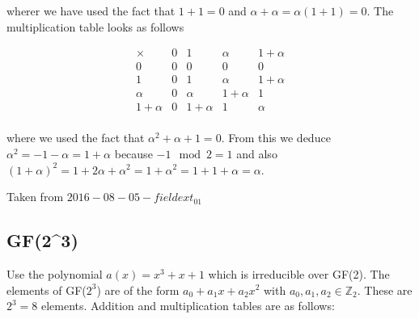 wherer we have used the fact that \(1 + 1 = 0\) and
\(\alpha + \alpha = \alpha (1+1) = 0\). The multiplication table looks
as follows

\[
\begin{array}{c|cccc}
\times  &    0        & 1        & \alpha     & 1+\alpha \\
\hline
0 &        0        & 0        & 0          & 0 \\
1 &        0        & 1        & \alpha     & 1 + \alpha   \\
\alpha &   0        & \alpha   & 1 + \alpha & 1        \\ 
1+\alpha & 0        &1+\alpha &  1  &        \alpha      \\
\end{array}
\]

where we used the fact that \(\alpha^2 + \alpha +1 =0\). From this we
deduce \(\alpha^2=-1-\alpha = 1 + \alpha\) because \(-1 \mod 2 =1\) and
also
\((1+\alpha)^2 = 1 + 2\alpha + \alpha^2 = 1 + \alpha^2 = 1 + 1 + \alpha = \alpha\).

Taken from $2016-08-05-fieldext_01$

\subsection{GF(2\^{}3)}\label{gf23}

Use the polynomial \(a(x)=x^3+x+1\) which is irreducible over GF(2). The
elements of GF(\(2^3\)) are of the form \(a_0 + a_1 x + a_2 x^2\) with
\(a_0, a_1, a_2 \in \mathbb{Z}_2\). These are \(2^3=8\) elements.
Addition and multiplication tables are as follows:

